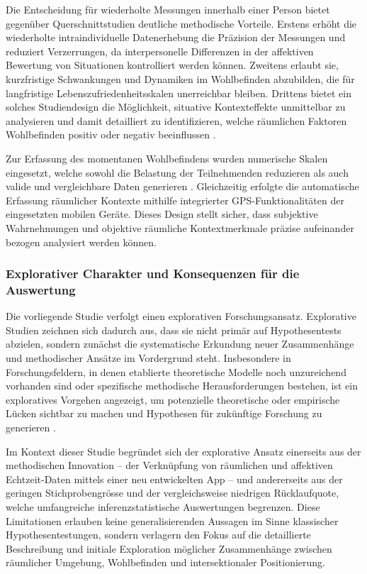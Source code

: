 Die Entscheidung für wiederholte Messungen innerhalb einer Person bietet gegenüber Querschnittstudien deutliche methodische Vorteile. Erstens erhöht die wiederholte intraindividuelle Datenerhebung die Präzision der Messungen und reduziert Verzerrungen, da interpersonelle Differenzen in der affektiven Bewertung von Situationen kontrolliert werden können. Zweitens erlaubt sie, kurzfristige Schwankungen und Dynamiken im Wohlbefinden abzubilden, die für langfristige Lebenszufriedenheitsskalen unerreichbar bleiben. Drittens bietet ein solches Studiendesign die Möglichkeit, situative Kontexteffekte unmittelbar zu analysieren und damit detailliert zu identifizieren, welche räumlichen Faktoren Wohlbefinden positiv oder negativ beeinflussen \parencite{birenboimInfluenceUrbanEnvironments2018, hammoudSmartphonebasedEcologicalMomentary2024}.

Zur Erfassung des momentanen Wohlbefindens wurden numerische Skalen eingesetzt, welche sowohl die Belastung der Teilnehmenden reduzieren als auch valide und vergleichbare Daten generieren \parencite{cookeMeasuringWellBeingReview2016}. Gleichzeitig erfolgte die automatische Erfassung räumlicher Kontexte mithilfe integrierter GPS-Funktionalitäten der eingesetzten mobilen Geräte. Dieses Design stellt sicher, dass subjektive Wahrnehmungen und objektive räumliche Kontextmerkmale präzise aufeinander bezogen analysiert werden können.

\subsubsection{Explorativer Charakter und Konsequenzen für die Auswertung}

Die vorliegende Studie verfolgt einen explorativen Forschungsansatz. Explorative Studien zeichnen sich dadurch aus, dass sie nicht primär auf Hypothesentests abzielen, sondern zunächst die systematische Erkundung neuer Zusammenhänge und methodischer Ansätze im Vordergrund steht. Insbesondere in Forschungsfeldern, in denen etablierte theoretische Modelle noch unzureichend vorhanden sind oder spezifische methodische Herausforderungen bestehen, ist ein exploratives Vorgehen angezeigt, um potenzielle theoretische oder empirische Lücken sichtbar zu machen und Hypothesen für zukünftige Forschung zu generieren \parencite{stebbinsExploratoryResearchSocial2001}.

Im Kontext dieser Studie begründet sich der explorative Ansatz einerseits aus der methodischen Innovation – der Verknüpfung von räumlichen und affektiven Echtzeit-Daten mittels einer neu entwickelten App – und andererseits aus der geringen Stichprobengrösse und der vergleichsweise niedrigen Rücklaufquote, welche umfangreiche inferenzstatistische Auswertungen begrenzen. Diese Limitationen erlauben keine generalisierenden Aussagen im Sinne klassischer Hypothesentestungen, sondern verlagern den Fokus auf die detaillierte Beschreibung und initiale Exploration möglicher Zusammenhänge zwischen räumlicher Umgebung, Wohlbefinden und intersektionaler Positionierung.

